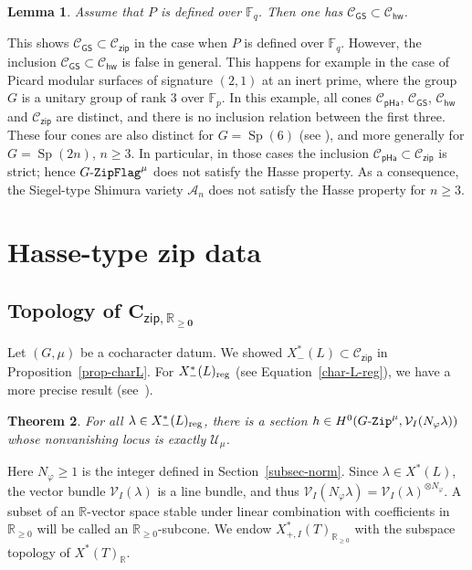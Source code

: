 \documentclass[11pt]{amsart}
\numberwithin{equation}{section}
\newtheorem{theorem}{Theorem}[section]
\newtheorem{lemma}[theorem]{Lemma}
\theoremstyle{definition}
\theoremstyle{remark}
\newcommand{\GZip}{\mathop{\text{$G$-{\tt Zip}}}\nolimits}
\newcommand{\pha}{\mathsf{pHa}}
\newcommand{\zipsf}{\mathsf{zip}}
\newcommand{\GSsf}{\mathsf{GS}}
\newcommand{\hwsf}{\mathsf{hw}}
\newcommand{\GF}{\mathop{\text{$G$-{\tt ZipFlag}}}\nolimits}
\newcommand{\Acal}{{\mathcal A}}
\newcommand{\Ccal}{{\mathcal C}}
\newcommand{\Ucal}{{\mathcal U}}
\newcommand{\Vcal}{{\mathcal V}}
\newcommand{\FF}{\mathbb{F}}
\newcommand{\RR}{\mathbb{R}}
\DeclareMathOperator{\Sp}{Sp}
\newcommand{\reg}{{\rm reg}}
\begin{document}
\begin{lemma}\label{CGS-contained} 
Assume that $P$ is defined over $\FF_q$. Then one has $\Ccal_{\GSsf}\subset \Ccal_{\hwsf}$.
\end{lemma}
This shows $\Ccal_{\GSsf}\subset \Ccal_{\zipsf}$ in the case when $P$ is defined over $\FF_q$. However, the inclusion $\Ccal_{\GSsf}\subset \Ccal_{\hwsf}$ is false in general. This happens for example in the case of Picard modular surfaces of signature $(2,1)$ at an inert prime, where the group $G$ is a unitary group of rank $3$ over $\FF_p$. In this example, all cones $\Ccal_{\pha}$, $\Ccal_{\GSsf}$, $\Ccal_{\hwsf}$ and $\Ccal_{\zipsf}$ are distinct, and there is no inclusion relation between the first three. These four cones are also distinct for $G=\Sp(6)$ (see \cite[Section~5.5]{Koskivirta-automforms-GZip}), and more generally for $G=\Sp(2n)$, $n\geq 3$. In particular, in those cases the inclusion $\Ccal_{\pha} \subset \Ccal_{\zipsf}$ is strict; hence $\GF^\mu$ does not satisfy the Hasse property. As a consequence, the Siegel-type Shimura variety $\Acal_n$ does not satisfy the Hasse property for $n\geq 3$.

\section{Hasse-type zip data}\label{sec4}


\subsection{Topology of $\boldsymbol{C_{\zipsf,\RR_{\geq 0}}}$}
Let $(G,\mu)$ be a cocharacter datum. We showed $X^*_{-}(L)\subset \Ccal_{\zipsf}$ in Proposition~\ref{prop-charL}. For $X_{-}^*(L)_{\reg}$ (see Equation~\eqref{char-L-reg}), we have a more precise result (see~\cite[Theorem 5.1.4]{Koskivirta-Wedhorn-Hasse}).

\begin{theorem}\label{theo-Hasse-inv}
For all $\lambda\in X^*_{-}(L)_{\reg}$, there is a section $h\in H^0(\GZip^\mu,\Vcal_I(N_\varphi\lambda))$ whose nonvanishing locus is exactly $\Ucal_\mu$.
\end{theorem}
Here $N_\varphi\geq 1$ is the integer defined in Section~\ref{subsec-norm}. Since $\lambda\in X^*(L)$, the vector bundle $\Vcal_I(\lambda)$ is a line bundle, and thus $\Vcal_I(N_\varphi\lambda)=\Vcal_I(\lambda)^{\otimes N_\varphi}$. A subset of an $\RR$-vector space stable under linear combination with coefficients in $\RR_{\geq 0}$ will be called an $\RR_{\geq 0}$-subcone. We endow $X^*_{+,I}(T)_{\RR_{\geq 0}}$ with the subspace topology of $X^*(T)_\RR$.
\end{document}
